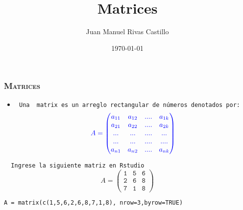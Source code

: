 \documentclass[16.5pt]{beamer}
\title{Matrices}
\author{Juan Manuel Rivas Castillo}
\institute{UNMSM}
\date{\today}
\begin{document}
\maketitle 


{
\begin{frame}
\frametitle{\textsc{\textbf{Matrices}}}
\hspace*{-5mm}
\vspace*{-5mm} 
\vspace{0.3cm}
\begin{itemize}
\item \texttt{ Una {\color{blue} matrix} es un arreglo rectangular de números denotados por:}
$$\color{blue} A= \mathtt{\begin{pmatrix} a_{11} &  a_{12}  &....&  a_{1k}  \\ 
a_{21} &  a_{22}  &....&  a_{2k} \\ 
... & ...&....& ... \\
... & ...&....& .... \\
a_{n1} &  a_{n2}  &....& a_{nk} \end{pmatrix}}$$

\end{itemize}
\texttt{  {\color{red} Ingrese la siguiente matriz en Rstudio} }
$$A= \mathtt{\begin{pmatrix} 1 & 5 & 6 \\ 2 & 6 & 8 \\ 7 & 1 & 8 \end{pmatrix}}$$

\begin{lstlisting}
A = matrix(c(1,5,6,2,6,8,7,1,8), nrow=3,byrow=TRUE)
\end{lstlisting}
\end{frame}


}

\end{document}
